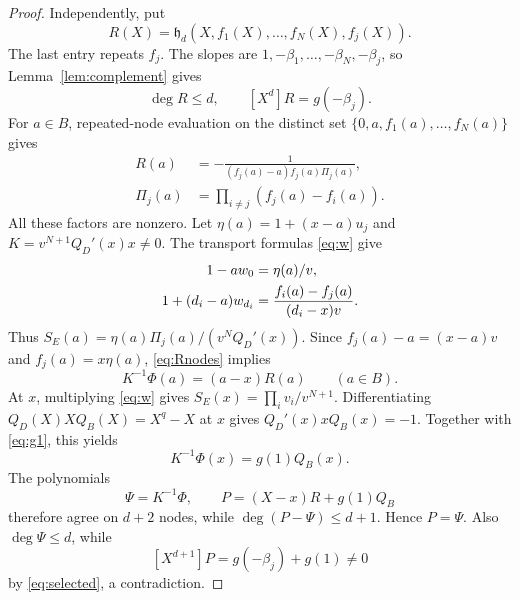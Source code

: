\documentclass[12pt,letterpaper,onecolumn]{article}
\theoremstyle{definition}
\newcommand{\HH}{\mathfrak h}
\begin{document}
\begin{proof}
Independently, put
\begin{equation}
 R(X)=\HH_d(X,f_1(X),\ldots,f_N(X),f_j(X)).
 \label{eq:R}
\end{equation}
The last entry repeats $f_j$. The slopes are $1,-\beta_1,\ldots,-\beta_N,-\beta_j$, so Lemma~\ref{lem:complement} gives
\begin{equation}
 \deg R\le d,\qquad [X^d]R=g(-\beta_j).
 \label{eq:Rtop}
\end{equation}
For $a\in B$, repeated-node evaluation on the distinct set $\{0,a,f_1(a),\ldots,f_N(a)\}$ gives
\begin{equation}
 \begin{aligned}
 R(a)&=-\frac1{(f_j(a)-a)f_j(a)\Pi_j(a)},\\
 \Pi_j(a)&=\prod_{i\ne j}(f_j(a)-f_i(a)).
 \end{aligned}
 \label{eq:Rnodes}
\end{equation}
All these factors are nonzero. Let $\eta(a)=1+(x-a)u_j$ and $K=v^{N+1}Q_D'(x)x\ne0$. The transport formulas \eqref{eq:w} give
\begin{align}
 1-aw_0&=\eta(a)/v,\notag\\
 1+(d_i-a)w_{d_i}&=\frac{f_i(a)-f_j(a)}{(d_i-x)v}.\notag
\end{align}
Thus $S_E(a)=\eta(a)\Pi_j(a)/(v^NQ_D'(x))$. Since $f_j(a)-a=(x-a)v$ and $f_j(a)=x\eta(a)$, \eqref{eq:Rnodes} implies
\begin{equation}
 K^{-1}\Phi(a)=(a-x)R(a)\qquad(a\in B).
 \label{eq:oldnodes}
\end{equation}
At $x$, multiplying \eqref{eq:w} gives $S_E(x)=\prod_i v_i/v^{N+1}$. Differentiating $Q_D(X)XQ_B(X)=X^q-X$ at $x$ gives $Q_D'(x)xQ_B(x)=-1$. Together with \eqref{eq:g1}, this yields
\begin{equation}
 K^{-1}\Phi(x)=g(1)Q_B(x).
 \label{eq:newnode}
\end{equation}
The polynomials
\[
 \Psi=K^{-1}\Phi,\qquad P=(X-x)R+g(1)Q_B
\]
therefore agree on $d+2$ nodes, while $\deg(P-\Psi)\le d+1$. Hence $P=\Psi$. Also $\deg\Psi\le d$, while
\[
 [X^{d+1}]P=g(-\beta_j)+g(1)\ne0
\]
by \eqref{eq:selected}, a contradiction.
\end{proof}
\end{document}
